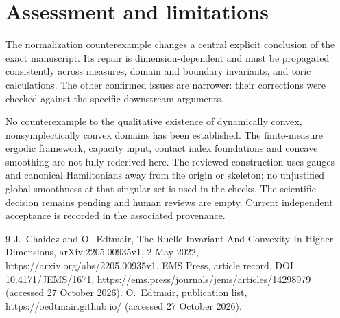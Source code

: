 \documentclass[10pt]{article}
\begin{document}
\section*{Assessment and limitations}
The normalization counterexample changes a central explicit conclusion of the exact manuscript. Its repair is dimension-dependent and must be propagated consistently across measures, domain and boundary invariants, and toric calculations. The other confirmed issues are narrower: their corrections were checked against the specific downstream arguments.\par
No counterexample to the qualitative existence of dynamically convex, nonsymplectically convex domains has been established. The finite-measure ergodic framework, capacity input, contact index foundations and concave smoothing are not fully rederived here. The reviewed construction uses gauges and canonical Hamiltonians away from the origin or skeleton; no unjustified global smoothness at that singular set is used in the checks. The scientific decision remains pending and human reviews are empty. Current independent acceptance is recorded in the associated provenance.\par
9 J. Chaidez and O. Edtmair, The Ruelle Invariant And Convexity In Higher Dimensions, arXiv:2205.00935v1, 2 May 2022, https://arxiv.org/abs/2205.00935v1. EMS Press, article record, DOI 10.4171/JEMS/1671, https://ems.press/journals/jems/articles/14298979 (accessed 27 October 2026). O. Edtmair, publication list, https://oedtmair.github.io/ (accessed 27 October 2026).\par
\end{document}
